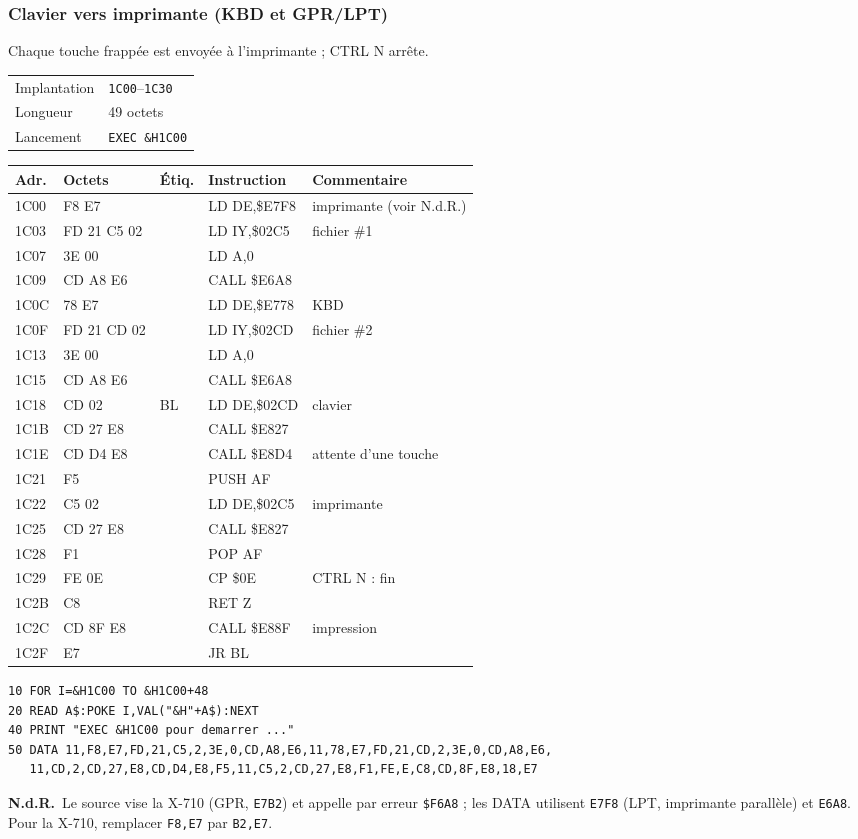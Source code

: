\documentclass[a4paper,10pt]{article}
\makeatletter
\newcommand{\hex}[1]{\texttt{#1}}
\newcommand{\nota}[1]{\textcolor{red!60!black}{\small\textbf{N.d.R.}~#1}}
\newcommand{\fiche}[3]{%
  \begin{center}\small
  \begin{tabular}{@{}ll@{}}
  \toprule
  Implantation & #1 \\
  Longueur & #2 \\
  Lancement & #3 \\
  \bottomrule
  \end{tabular}
  \end{center}}
\newenvironment{asm}
  {\small\begin{longtable}{@{}>{\ttfamily}l>{\ttfamily}l>{\ttfamily}l>{\ttfamily}l>{\raggedright\arraybackslash}p{6.2cm}@{}}
   \toprule
   \normalfont\bfseries Adr. & \normalfont\bfseries Octets & \normalfont\bfseries Étiq. & \normalfont\bfseries Instruction & \textbf{Commentaire}\\
   \midrule\endhead
   \bottomrule\endfoot}
  {\end{longtable}}
\makeatother
\begin{document}
\subsubsection*{Clavier vers imprimante (KBD et GPR/LPT)}
Chaque touche frappée est envoyée à l'imprimante ; CTRL N arrête.
\fiche{\hex{1C00}--\hex{1C30}}{49 octets}{\texttt{EXEC \&H1C00}}
\begin{asm}
1C00 & 11 F8 E7 & & LD DE,\$E7F8   & imprimante (voir N.d.R.) \\
1C03 & FD 21 C5 02 & & LD IY,\$02C5 & fichier \#1 \\
1C07 & 3E 00    & & LD A,0         & \\
1C09 & CD A8 E6 & & CALL \$E6A8    & \\
1C0C & 11 78 E7 & & LD DE,\$E778   & KBD \\
1C0F & FD 21 CD 02 & & LD IY,\$02CD & fichier \#2 \\
1C13 & 3E 00    & & LD A,0         & \\
1C15 & CD A8 E6 & & CALL \$E6A8    & \\
1C18 & 11 CD 02 & BL & LD DE,\$02CD & clavier \\
1C1B & CD 27 E8 & & CALL \$E827    & \\
1C1E & CD D4 E8 & & CALL \$E8D4    & attente d'une touche \\
1C21 & F5       & & PUSH AF        & \\
1C22 & 11 C5 02 & & LD DE,\$02C5   & imprimante \\
1C25 & CD 27 E8 & & CALL \$E827    & \\
1C28 & F1       & & POP AF         & \\
1C29 & FE 0E    & & CP \$0E        & CTRL N : fin \\
1C2B & C8       & & RET Z          & \\
1C2C & CD 8F E8 & & CALL \$E88F    & impression \\
1C2F & 18 E7    & & JR BL          & \\
\end{asm}
\begin{verbatim}
10 FOR I=&H1C00 TO &H1C00+48
20 READ A$:POKE I,VAL("&H"+A$):NEXT
40 PRINT "EXEC &H1C00 pour demarrer ..."
50 DATA 11,F8,E7,FD,21,C5,2,3E,0,CD,A8,E6,11,78,E7,FD,21,CD,2,3E,0,CD,A8,E6,
   11,CD,2,CD,27,E8,CD,D4,E8,F5,11,C5,2,CD,27,E8,F1,FE,E,C8,CD,8F,E8,18,E7
\end{verbatim}
\nota{Le source vise la X-710 (GPR, \hex{E7B2}) et appelle par erreur
\texttt{\$F6A8} ; les DATA utilisent \hex{E7F8} (LPT, imprimante parallèle)
et \hex{E6A8}. Pour la X-710, remplacer \texttt{F8,E7} par \texttt{B2,E7}.}
\end{document}
